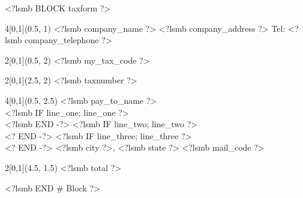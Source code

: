<?lsmb BLOCK taxform ?>
\begin{textblock}{4}[0,1](0.5, 1)
<?lsmb company_name ?>
<?lsmb company_address ?>
Tel: <?lsmb company_telephone ?>
\end{textblock}

\begin{textblock}{2}[0,1](0.5, 2)
<?lsmb my_tax_code ?>
\end{textblock}

\begin{textblock}{2}[0,1](2.5, 2)
<?lsmb taxnumber ?>
\end{textblock}

\begin{textblock}{4}[0,1](0.5, 2.5)
<?lsmb pay_to_name ?>\\
<?lsmb IF line_one; line_one ?> \\ <?lsmb END -?>
<?lsmb IF line_two; line_two ?> \\ <? END -?>
<?lsmb IF line_three; line_three ?> \\ <? END -?>
<?lsmb city ?>, <?lsmb state ?> <?lsmb mail_code ?>
\end{textblock}

\begin{textblock}{2}[0,1](4.5, 1.5)
<?lsmb total ?>
\end{textblock}
<?lsmb END # Block ?>
